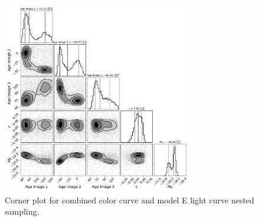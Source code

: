 \documentclass[twocolumn]{aastex63}
\begin{document}
\begin{figure}
    \centering
    \includegraphics[width=0.75\textwidth]{Images/corner_combined_lc_color_model_E.pdf}
    \caption{Corner plot for combined color curve and model E light curve nested sampling.}
    \label{fig:corner_combined}
\end{figure}
\end{document}
